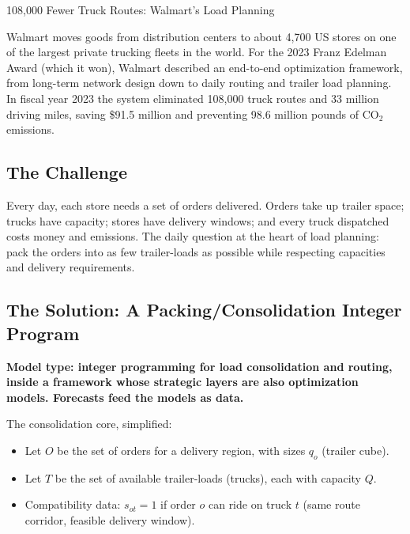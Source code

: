 \begin{casestudybox}{108{,}000 Fewer Truck Routes: Walmart's Load Planning}

Walmart moves goods from distribution centers to about 4{,}700 US stores on one of the largest private trucking fleets in the world.  For the 2023 Franz Edelman Award (which it won), Walmart described an end-to-end optimization framework, from long-term network design down to daily routing and trailer load planning.  In fiscal year 2023 the system eliminated 108{,}000 truck routes and 33 million driving miles, saving \$91.5 million and preventing 98.6 million pounds of CO$_2$ emissions.

\subsection*{The Challenge}
Every day, each store needs a set of orders delivered.  Orders take up trailer space; trucks have capacity; stores have delivery windows; and every truck dispatched costs money and emissions.  The daily question at the heart of load planning: pack the orders into as few trailer-loads as possible while respecting capacities and delivery requirements.

\subsection*{The Solution: A Packing/Consolidation Integer Program}
\textbf{Model type: integer programming for load consolidation and routing, inside a framework whose strategic layers are also optimization models.  Forecasts feed the models as data.}

The consolidation core, simplified:

\begin{itemize}
\item Let $O$ be the set of orders for a delivery region, with sizes $q_o$ (trailer cube).
\item Let $T$ be the set of available trailer-loads (trucks), each with capacity $Q$.
\item Compatibility data: $s_{ot} = 1$ if order $o$ can ride on truck $t$ (same route corridor, feasible delivery window).
\end{itemize}


\end{casestudybox}
